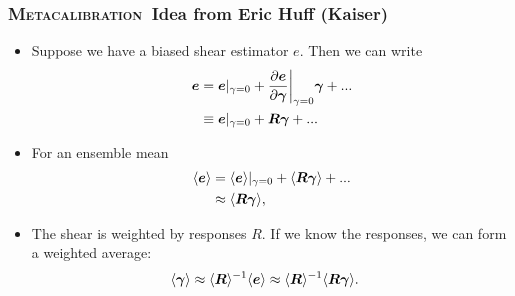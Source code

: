 \documentclass{beamer}
\newcommand{\Mcal}{\textsc{Metacalibration}}
\newcommand{\mcalR}{\mbox{\boldmath $R$}}
\newcommand{\vecg}{\mbox{\boldmath $\gamma$}}
\newcommand{\vest}{\mbox{\boldmath $e$}}
\begin{document}
\frame
{
    \frametitle{\Mcal\ Idea from Eric Huff (Kaiser)}

 
    \begin{itemize}

        \item Suppose we have a biased shear estimator {\color{gold} \vest}.  Then we can write
            {\color{gold}
\begin{align} \label{eq:Eexpand}
    \vest &= \vest|_{\gamma=0} + \frac{ \partial \vest }{ \partial \vecg}\bigg|_{\gamma=0} \vecg  + ... \nonumber \\
          &\equiv \vest|_{\gamma=0} + \mbox{\mcalR}\vecg  + ...
\end{align}
            } 

        \item For an ensemble mean
            {\color{gold}
                \begin{align}
                    \langle \vest \rangle &= \langle \vest \rangle |_{\gamma=0} + \langle \mbox{\mcalR} \vecg \rangle + ... \nonumber \\
                                          &\approx \langle \mbox{\mcalR} \vecg \rangle,
                \end{align}
                }

            \item The shear is weighted by responses {\color{cadetblue} \mcalR}.  If we know the
                responses, we can form a weighted average:
            {\color{gold}
\begin{align} \label{eq:rcorr}
    \langle \vecg \rangle &\approx \langle \mbox{\mcalR} \rangle^{-1}  \langle \vest \rangle \approx \langle \mbox{\mcalR} \rangle^{-1} \langle \mcalR \vecg \rangle.
\end{align}
            }
    \end{itemize}
}
\end{document}
